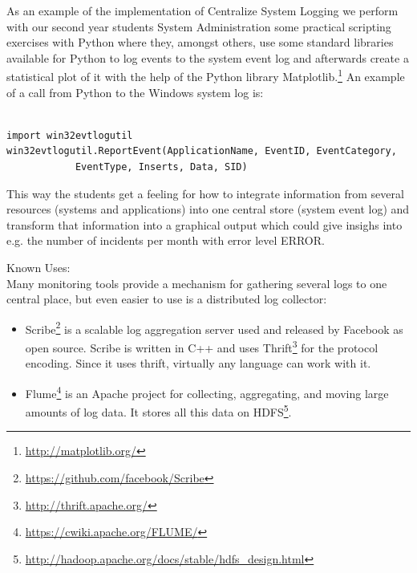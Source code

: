 
\begin{center}
   
\end{center}

As an example of the implementation of {\sc Centralize System Logging} we perform with our second year students System Administration some practical scripting exercises with Python where they, amongst others, use some standard libraries available for Python to log events to the system event log and afterwards create a statistical plot of it with the help of the Python library Matplotlib.\footnote{\url{http://matplotlib.org/}} 
An example of a call from Python to the Windows system log is:

               
\lstset{language=Python}

\begin{lstlisting}

import win32evtlogutil
win32evtlogutil.ReportEvent(ApplicationName, EventID, EventCategory,
    		EventType, Inserts, Data, SID)

\end{lstlisting}


This way the students get a feeling for how to integrate information from several resources (systems and applications) into one central store (system event log) and transform that information into a graphical output which could give insighs into e.g. the number of incidents per month with error level ERROR.

Known Uses:\\
Many monitoring tools provide a mechanism for gathering several logs to one central place, but even easier to use is a distributed log collector:
\begin{itemize}
	\item Scribe\footnote{\url{https://github.com/facebook/Scribe}} is a scalable log aggregation server used and released by Facebook as open source. Scribe is written in C++ and uses Thrift\footnote{\url{http://thrift.apache.org/}} for the protocol encoding. Since it uses thrift, virtually any language can work with it.
	\item Flume\footnote{\url{https://cwiki.apache.org/FLUME/}} is an Apache project for collecting, aggregating, and moving large amounts of log data. It stores all this data on HDFS\footnote{\url{http://hadoop.apache.org/docs/stable/hdfs_design.html}}.
\end{itemize}




